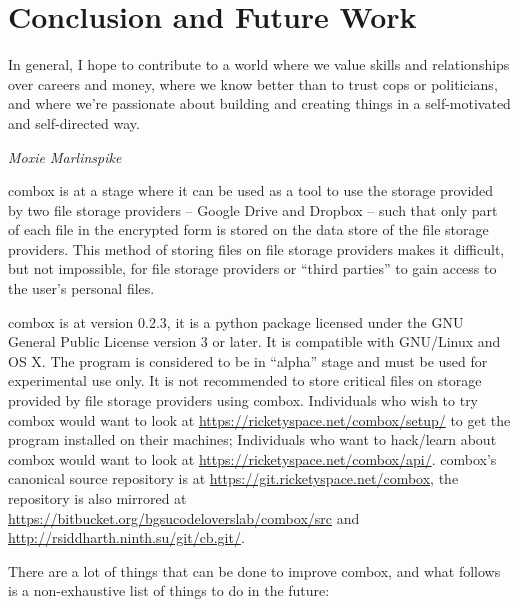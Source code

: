 \chapter{Conclusion and Future Work}\label{ch:5}

\epigraph{In general, I hope to contribute to a world where we value
  skills and relationships over careers and money, where we know
  better than to trust cops or politicians, and where we're passionate
  about building and creating things in a self-motivated and
  self-directed way.}{\textit{Moxie Marlinspike}}

combox is at a stage where it can be used as a tool to use the storage
provided by two file storage providers -- Google Drive and Dropbox --
such that only part of each file in the encrypted form is stored on
the data store of the file storage providers. This method of storing
files on file storage providers makes it difficult, but not
impossible, for file storage providers or ``third parties'' to gain
access to the user's personal files.

combox is at version 0.2.3, it is a python package licensed under the
GNU General Public License version 3 or later. It is compatible with
GNU/Linux and OS X. The program is considered to be in ``alpha'' stage
and must be used for experimental use only. It is not recommended to
store critical files on storage provided by file storage providers
using combox. Individuals who wish to try combox would want to look at
\url{https://ricketyspace.net/combox/setup/} to get the program
installed on their machines; Individuals who want to hack/learn about
combox would want to look at
\url{https://ricketyspace.net/combox/api/}. combox's canonical source
repository is at \url{https://git.ricketyspace.net/combox}, the
repository is also mirrored at
\url{https://bitbucket.org/bgsucodeloverslab/combox/src} and
\url{http://rsiddharth.ninth.su/git/cb.git/}.

There are a lot of things that can be done to improve combox, and what
follows is a non-exhaustive list of things to do in the future:

